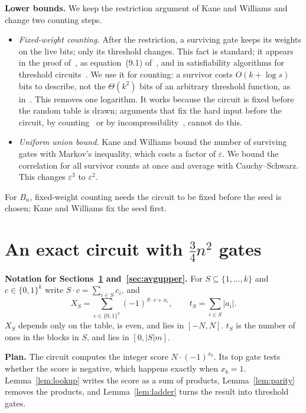 \documentclass[11pt,letterpaper]{article}
\theoremstyle{remark}
\newcommand{\bits}{\{0,1\}}
\newcommand{\sect}[1]{\section{\texorpdfstring{\color{ink}#1}{#1}}}
\newcommand{\smalltitle}[1]{\textbf{\color{ink}#1}\quad}
\begin{document}
\smalltitle{Lower bounds.}
We keep the restriction argument of Kane and Williams and change two counting
steps.
\begin{itemize}
\item \emph{Fixed-weight counting.} After the restriction, a surviving gate
      keeps its weights on the live bits; only its threshold changes. This
      fact is standard; it appears in the proof of~\cite[Lemma~1.1]{KW}, as
      equation~(9.1) of~\cite{CSS}, and in satisfiability algorithms for
      threshold circuits~\cite{CTW}. We use it for counting: a survivor costs
      $O(k+\log s)$ bits to describe, not the $\Theta(k^2)$ bits of an
      arbitrary threshold function, as in~\cite{KW,KKL,CSS}. This removes one
      logarithm. It works because the circuit is fixed before the random table
      is drawn; arguments that fix the hard input before the circuit, by
      counting~\cite{KW,CSS} or by incompressibility~\cite{KKL}, cannot do
      this.
\item \emph{Uniform union bound.} Kane and Williams bound the number of
      surviving gates with Markov's inequality, which costs a factor of
      $\varepsilon$. We bound the correlation for all survivor counts at
      once and average with Cauchy--Schwarz. This changes $\varepsilon^3$
      to $\varepsilon^2$.
\end{itemize}
For $B_n$, fixed-weight counting needs the circuit to be fixed before the
seed is chosen; Kane and Williams fix the seed first.

\sect{An exact circuit with \texorpdfstring{$\tfrac34 n^2$}{3/4 n\^{}2} gates}\label{sec:upper}

\begin{keybox}
\textbf{Notation for Sections~\ref{sec:upper} and~\ref{sec:avgupper}.}
For $S\subseteq\{1,\dots,k\}$ and $c\in\bits^k$ write $S\cdot c=\sum_{i\in S}c_i$, and
\[
X_S=\sum_{c\in\bits^k}(-1)^{S\cdot c+x_c},\qquad
t_S=\sum_{i\in S}|a_i| .
\]
$X_S$ depends only on the table, is even, and lies in $[-N,N]$.
$t_S$ is the number of ones in the blocks in $S$, and lies in $[0,|S|m]$.
\end{keybox}

\smalltitle{Plan.}
The circuit computes the integer score $N\cdot(-1)^{x_b}$. Its top gate
tests whether the score is negative, which happens exactly when $x_b=1$.
Lemma~\ref{lem:lookup} writes the score as a sum of products,
Lemma~\ref{lem:parity} removes the products, and Lemma~\ref{lem:ladder}
turns the result into threshold gates.
\end{document}

